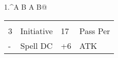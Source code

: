\documentclass{article}
\begin{document}
\begin{adjustbox}{minipage=0.45\textwidth, margin=\fboxsep, bgimage=../images/texture2.pdf}
{\begin{minipage}[t][10.5in][t]{0.9\textwidth}
\begin{minipage}[t]{0.75\textwidth}
\begin{tabularx}{1.\textwidth}{^A B A B@{}}
                \end{tabularx}
                \begin{tabularx}{1.\textwidth}{A B A B@{}} 
                    \\
                    3 & Initiative & 17 & Pass Per \\ \hline
                    - & Spell DC & +6 & ATK \\ \hline
                \end{tabularx}
            \end{minipage}        
        \end{minipage}
	}
\end{adjustbox}
\end{document}

